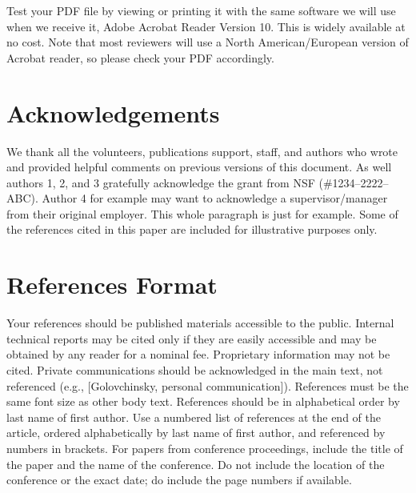 \documentclass[sigchi-a, authorversion]{acmart}
\begin{document}
Test your PDF file by viewing or printing it with the same software we
will use when we receive it, Adobe Acrobat Reader Version 10. This is
widely available at no cost. Note that most reviewers will use a North
American/European version of Acrobat reader, so please check your PDF
accordingly.

\section{Acknowledgements}

We thank all the volunteers, publications support, staff, and authors
who wrote and provided helpful comments on previous versions of this
document. As well authors 1, 2, and 3 gratefully acknowledge the grant
from NSF (\#1234--2222--ABC). Author 4 for example may want to
acknowledge a supervisor/manager from their original employer. This
whole paragraph is just for example. Some of the references cited in
this paper are included for illustrative purposes only.

\section{References Format}

Your references should be published materials accessible to the
public. Internal technical reports may be cited only if they are
easily accessible and may be obtained by any reader for a nominal fee.
Proprietary information may not be cited. Private communications
should be acknowledged in the main text, not referenced (e.g.,
[Golovchinsky, personal communication]). References must be the same
font size as other body text. References should be in alphabetical
order by last name of first author. Use a numbered list of references
at the end of the article, ordered alphabetically by last name of
first author, and referenced by numbers in brackets. For papers from
conference proceedings, include the title of the paper and the name of
the conference. Do not include the location of the conference or the
exact date; do include the page numbers if available.
\end{document}
